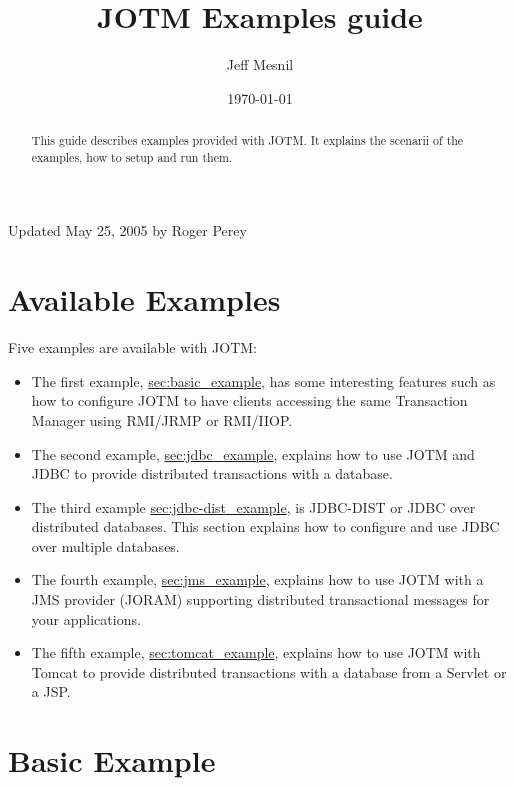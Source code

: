 \documentclass[a4paper,11pt]{article}
\title{JOTM Examples guide}
\author{Jeff Mesnil}
\date{\today}
\begin{document}
\maketitle

\begin{abstract}
  This guide describes examples provided with JOTM. It explains the
  scenarii of the examples, how to setup and run them.
\end{abstract}

\noindent Updated May 25, 2005 by Roger Perey\\

\tableofcontents

\section{Available Examples}
\label{sec:into}
Five examples are available with JOTM:
\begin{itemize}
\item The first example, \hyperref{basic example}{\textbf{basic} (section
  }{)}{sec:basic_example}, has some interesting features such as how to
 configure JOTM to have clients accessing the same Transaction
 Manager using RMI/JRMP or RMI/IIOP.
\item The second example, \hyperref{jdbc example}{\textbf{jdbc} (section
  }{)}{sec:jdbc_example}, explains how to use JOTM and JDBC to provide
  distributed transactions with a database.
\item The third example \hyperref{JDBC-DIST example}{\textbf{jdbc-dist} (section
  }{)}{sec:jdbc-dist_example}, is JDBC-DIST or JDBC over distributed databases.
 This section explains how to configure and use JDBC over multiple databases.
\item The fourth example, \hyperref{JMS example}{\textbf{jms} (section
  }{)}{sec:jms_example}, explains how to use JOTM with a JMS provider (JORAM)
  supporting distributed transactional messages for your applications.
\item The fifth example, \hyperref{Tomcat example}{\textbf{tomcat} (section
  }{)}{sec:tomcat_example}, explains how to use JOTM with
  Tomcat to provide distributed transactions with a database from a
  Servlet or a JSP.

\end{itemize}

\section{Basic Example}
\label{sec:basic_example}
\end{document}

